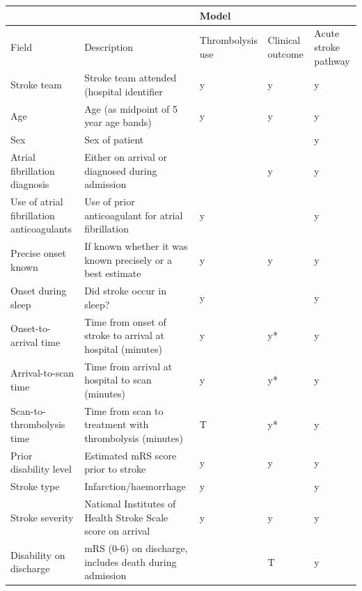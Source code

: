 
\renewcommand{\thefootnote}{\alph{footnote}}

\begin{landscape}

\begin{table}[!ht]
    \centering
    \begin{tabular}{|l|l|l|l|l|}
    \hline
        ~ & ~ & Model & ~ & ~ \\ \hline
        Field & Description & Thrombolysis use & Clinical outcome & Acute stroke pathway \\ \hline
        Stroke team & Stroke team attended (hospital identifier & y & y & y \\ \hline
        Age & Age (as midpoint of 5 year age bands) & y & y & y \\ \hline
        Sex & Sex of patient & ~ & ~ & y \\ \hline
        Atrial fibrillation diagnosis & Either on arrival or diagnosed during admission & ~ & y & y \\ \hline
        Use of atrial fibrillation anticoagulants & Use of prior anticoagulant for atrial fibrillation & y & ~ & y \\ \hline
        Precise onset known & If known whether it was known precisely or a best estimate & y & y & y \\ \hline
        Onset during sleep & Did stroke occur in sleep? & y & ~ & y \\ \hline
        Onset-to-arrival time & Time from onset of stroke to arrival at hospital (minutes) & y & y* & y \\ \hline
        Arrival-to-scan time & Time from arrival at hospital to scan (minutes) & y & y* & y \\ \hline
        Scan-to-thrombolysis time & Time from scan to treatment with thrombolysis (minutes) & T & y* & y \\ \hline
        Prior disability level & Estimated mRS score prior to stroke & y & y & y \\ \hline
        Stroke type & Infarction/haemorrhage & y & ~ & y \\ \hline
        Stroke severity & National Institutes of Health Stroke Scale score on arrival & y & y & y \\ \hline
        Disability on discharge & mRS (0-6) on discharge, includes death during admission & ~ & T & y \\ \hline
    \end{tabular}
\end{table}
\end{landscape}


